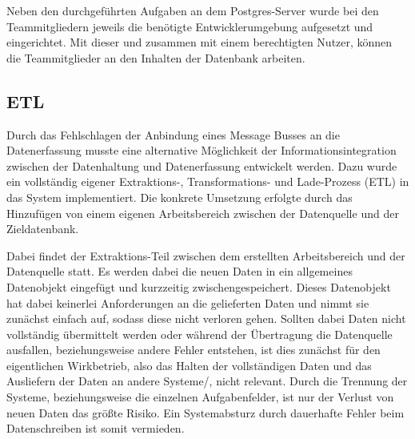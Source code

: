 Neben den durchgeführten Aufgaben an dem Postgres\hyp{}Server wurde bei den
Teammitgliedern jeweils die benötigte Entwicklerumgebung aufgesetzt und
eingerichtet. Mit dieser und zusammen mit einem berechtigten Nutzer, können die
Teammitglieder an den Inhalten der Datenbank arbeiten.
\nl%

\subsection{ETL}
\label{subsec:postgres_etl}
Durch das Fehlschlagen der Anbindung eines Message Busses an die Datenerfassung
musste eine alternative Möglichkeit der Informationsintegration zwischen der
Datenhaltung und Datenerfassung entwickelt werden. Dazu wurde ein vollständig
eigener Extraktions-, Transformations- und Lade-Prozess (ETL) in das System
implementiert. Die konkrete Umsetzung erfolgte durch das Hinzufügen von einem
eigenen Arbeitsbereich zwischen der Datenquelle und der Zieldatenbank.

Dabei findet der Extraktions\hyp{}Teil zwischen dem erstellten Arbeitsbereich
und der Datenquelle statt. Es werden dabei die neuen Daten in ein allgemeines
Datenobjekt eingefügt und kurzzeitig zwischengespeichert. Dieses Datenobjekt
hat dabei keinerlei Anforderungen an die gelieferten Daten und nimmt sie
zunächst einfach auf, sodass diese nicht verloren gehen. Sollten dabei Daten
nicht vollständig übermittelt werden oder während der Übertragung die
Datenquelle ausfallen, beziehungsweise andere Fehler entstehen, ist dies
zunächst für den eigentlichen Wirkbetrieb, also das Halten der vollständigen
Daten und das Ausliefern der Daten an andere Systeme/, nicht
relevant.  Durch die Trennung der Systeme, beziehungsweise die einzelnen
Aufgabenfelder, ist nur der Verlust von neuen Daten das größte Risiko. Ein
Systemabsturz durch dauerhafte Fehler beim Datenschreiben ist somit vermieden.

